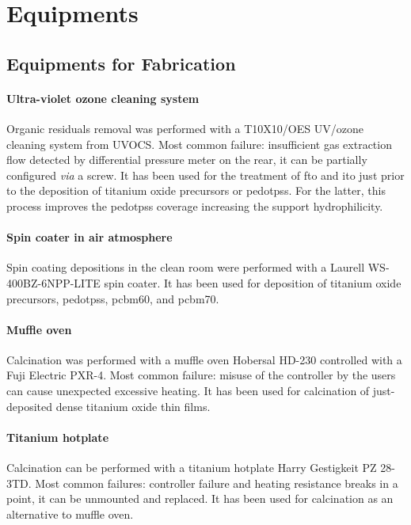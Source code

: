 \section{Equipments}

	\subsection{Equipments for Fabrication}

		\paragraph{Ultra-violet ozone cleaning system}
		Organic residuals removal was performed with a T10X10/OES UV/ozone cleaning system from UVOCS.
		Most common failure: insufficient gas extraction flow detected by differential pressure meter on the rear, it can be partially configured \textsl{via} a screw.
		It has been used for the treatment of \gls{fto} and \gls{ito} just prior to the deposition of titanium oxide precursors or \gls{pedotpss}.
		For the latter, this process improves the \gls{pedotpss} coverage increasing the support hydrophilicity.

		\paragraph{Spin coater in air atmosphere}
		Spin coating depositions in the clean room were performed with a Laurell WS-400BZ-6NPP-LITE spin coater.
		It has been used for deposition of titanium oxide precursors, \gls{pedotpss}, \gls{pcbm60}, and \gls{pcbm70}.

		\paragraph{Muffle oven}
		Calcination was performed with a muffle oven Hobersal HD-230 controlled with a Fuji Electric PXR-4.
		Most common failure: misuse of the controller by the users can cause unexpected excessive heating.
		It has been used for calcination of just-deposited dense titanium oxide thin films.

		\paragraph{Titanium hotplate}
		Calcination can be performed with a titanium hotplate Harry Gestigkeit PZ 28-3TD.
		Most common failures: controller failure and heating resistance breaks in a point, it can be unmounted and replaced.
		It has been used for calcination as an alternative to muffle oven.

